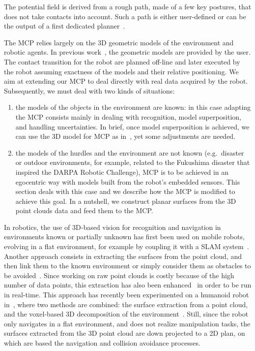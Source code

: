 The potential field is derived from a rough path, made of a few key postures, that does not take contacts into account.
Such a path is either user-defined or can be the output of a first dedicated planner~\cite{bouyarmane:icra:2009}.

The MCP relies largely on the 3D geometric models of the environment and robotic agents.
In previous work~\cite{escande:ras:2013,bouyarmane:ar:2012}, the geometric models are provided by the user.
The contact transition for the robot are planned off-line and later executed by the robot assuming exactness of the models and their relative positioning.
We aim at extending our MCP to deal directly with real data acquired by the robot.
Subsequently, we must deal with two kinds of situations:
\begin{enumerate}
  \item the models of the objects in the environment are known: in this case adapting the MCP consists mainly in dealing with recognition, model superposition, and handling uncertainties.
  In brief, once model superposition is achieved, we can use the 3D model for MCP as in~\cite{escande:ras:2013,bouyarmane:ar:2012}, yet some adjustments are needed.
  \item the models of the hurdles and the environment are not known (e.g.\ disaster or outdoor environments, for example, related to the Fukushima disaster that inspired the DARPA Robotic Challenge), MCP is to be achieved in an egocentric way with models built from the robot's embedded sensors.
  This section deals with this case and we describe how the MCP is modified to achieve this goal.
  In a nutshell, we construct planar surfaces from the 3D point clouds data and feed them to the MCP.\@
\end{enumerate}

In robotics, the use of 3D-based vision for recognition and navigation in environments known or partially unknown has first been used on mobile robots, evolving in a flat environment, for example by coupling it with a SLAM system~\cite{whitty:acra:2012}.
Another approach consists in extracting the surfaces from the point cloud, and then link them to the known environment or simply consider them as obstacles to be avoided~\cite{poppinga:iros:2008}.
Since working on raw point clouds is costly because of the high number of data points, this extraction has also been enhanced~\cite{biswas:icra:2012} in order to be run in real-time.
This approach has recently been experimented on a humanoid robot in~\cite{maier:humanoids:2012}, where two methods are combined: the surface extraction from a point cloud, and the voxel-based 3D decomposition of the environment~\cite{nakhaei:humanoids:2008}.
Still, since the robot only navigates in a flat environment, and does not realize manipulation tasks, the surfaces extracted from the 3D point cloud are down projected to a 2D plan, on which are based the navigation and collision avoidance processes.

